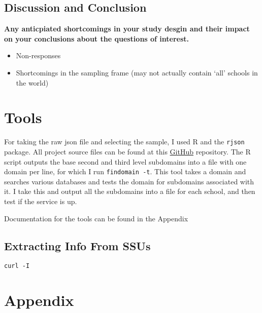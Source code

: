 \documentclass{article}
\theoremstyle{definition}
\begin{document}
\begin{flushleft}
\subsection{Discussion and Conclusion}
\textbf{Any anticpiated shortcomings in your study desgin
and their impact on your conclusions about the questions
of interest.}
\begin{itemize}
\item Non-responses
\item Shortcomings in the sampling frame (may not actually contain `all' schools in the world)
\end{itemize}



\section{Tools} \label{sec:tools}
For taking the raw json file and selecting the sample, I used R and the \texttt{rjson}
package. All project source files can be found at this
\href{https://github.com/chrissobczak/os-survey}{GitHub} repository.
The R script outputs the base second and third level subdomains
into a file with one domain per line, for which I run \texttt{findomain -t}.
This tool takes a domain and searches various databases and tests the domain
for subdomains associated with it. I take this and output all the subdomains
into a file for each school, and then test if the service is up.

Documentation for the tools can be found in the Appendix
\subsection{Extracting Info From SSUs}
\texttt{curl -I}


\end{flushleft}
\printbibliography
\section{Appendix}
\end{document}
